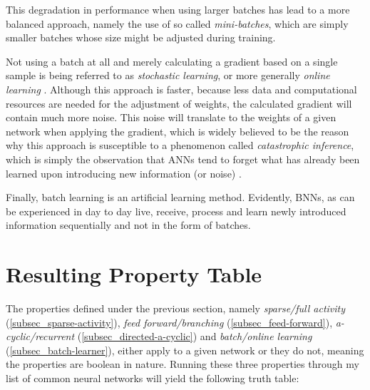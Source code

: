 This degradation in performance when using larger batches has lead to a more balanced approach, namely the use of so called \textit{mini-batches}, which are simply smaller
batches whose size might be adjusted during training.
\cite[chapter 4.1]{LeCunBOM12}


Not using a batch at all and merely calculating a gradient based on a single sample
is being referred to as \textit{stochastic learning}, or more generally \textit{online learning} \cite[chapter 4.1]{LeCunBOM12} \cite{30_online-deep-learning} \cite[subsection 8.1.3]{Goodfellow-et-al-2016}. 
Although this approach is faster, because less data and computational
resources are needed for the adjustment of weights,
the calculated gradient will contain much more noise.
This noise will translate to the weights of a given network when applying
the gradient, which is widely believed to be the reason why this approach
is susceptible to a phenomenon called \textit{catastrophic inference},
which is simply the observation that \acp{ANN} tend to forget what has already been learned upon introducing new information (or noise) \cite[p. 1]{20_catastrophic-inference}.
\linebreak


Finally, batch learning is an artificial learning method.
Evidently, \acp{BNN}, as can be experienced in day to day live,
receive, process and learn newly introduced information sequentially
and not in the form of batches.
 

\clearpage

\section{Resulting Property Table}

The properties defined under the previous section, namely
\textit{sparse/full activity} (\ref{subsec_sparse-activity}), 
\textit{feed forward/branching} (\ref{subsec_feed-forward}), 
\textit{a-cyclic/recurrent} (\ref{subsec_directed-a-cyclic}) and \textit{batch/online learning} (\ref{subsec_batch-learner}), 
either apply to a given network or they do not, 
meaning the properties are boolean in nature. Running these three properties through my list of common neural networks will yield the following truth table:


